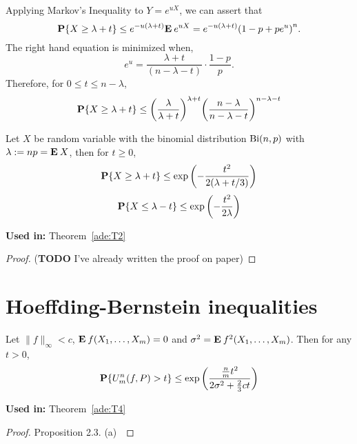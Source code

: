 Applying Markov's Inequality to $Y = e^{uX}$, we can assert that
  \[
    \P\{X \geq \lambda + t\} \leq e^{-u(\lambda+t)} \E e^{uX} = e^{-u(\lambda+ t)} {(1-p + p e^{u})}^n. 
  \] 
  The right hand equation is minimized when,
  \[ e^{u} = \frac{\lambda+t}{(n-\lambda-t)} \cdot \frac{1-p}{p}. \]
  Therefore, for $0 \leq t \leq n-\lambda$,
  \begin{equation}\label{co:1}
    \P\{X \geq \lambda + t\} \leq {\left(\frac{\lambda}{\lambda+t}\right)}^{\lambda + t} {\left(\frac{n-\lambda}{n-\lambda-t}\right)}^{n - \lambda - t}
  \end{equation}

\begin{theorem}\label{co:T1}
  Let $X$ be random variable with the binomial distribution $\Bi(n,p)$ with $\lambda := np = \E X$, then for $t \geq 0$,
  \begin{equation}\label{co:2}
    \P\{X \geq \lambda + t\} \leq \exp\left(- \frac{t^2}{2(\lambda+t/3)}\right)
  \end{equation}
  \begin{equation}\label{co:3}
    \P\{X \leq \lambda - t\} \leq \exp\left(- \frac{t^2}{2\lambda}\right)
  \end{equation}
\end{theorem}

\textbf{Used in:} Theorem~\ref{ade:T2}

\begin{proof}
  (\textbf{TODO} I've already written the proof on paper)
\end{proof}

\section{Hoeffding-Bernstein inequalities}

\begin{theorem}\label{hb:T1}
  Let $\|f\|_\infty < c$, $\E f(X_1,\ldots, X_m) = 0$ and $\sigma^2 = \E f^2(X_1,\ldots, X_m)$. Then for any $t > 0$,
  \begin{equation}
    \P\{U_m^n(f,P) > t\} \leq \exp \left(\dfrac{\tfrac{n}{m}t^2}{2\sigma^2 + \tfrac{2}{3}ct}\right)
  \end{equation}
\end{theorem}

\textbf{Used in:} Theorem~\ref*{ade:T4}

\begin{proof}
  Proposition 2.3. (a)~\cite{arcones1993limit}
\end{proof}